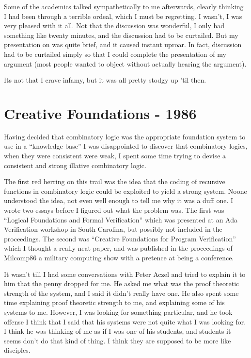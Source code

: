 \documentclass[10pt,titlepage]{book}
\begin{document}
Some of the academics talked sympathetically to me afterwards, clearly thinking I had been through a terrible ordeal, which I must be regretting.
I wasn't, I was very pleased with it all.
Not that the discussion was wonderful, I only had something like twenty minutes, and the discussion had to be curtailed.
But my presentation on was quite brief, and it caused instant uproar.
In fact, discussion had to be curtailed simply so that I could complete the presentation of my argument (most people wanted to object without actually hearing the argument).

Its not that I crave infamy, but it was all pretty stodgy up 'til then.

\section{Creative Foundations - 1986}

Having decided that combinatory logic was the appropriate foundation system to use in a ``knowledge base'' I was disappointed to discover that combinatory logics, when they were consistent were weak, I spent
some time trying to devise a consistent and strong illative combinatory logic.

The first red herring on this trail was the idea that the coding of recursive functions in combinatory logic could be exploited to yield a strong system.
Noone understood the idea, not even well enough to tell me why it was a duff one.
I wrote two essays before I figured out what the problem was.
The first was ``Logical Foundations and Formal Verification'' which was presented at an Ada Verification workshop in South Carolina, but possibly not included in the proceedings.
The second was ``Creative Foundations for Program Verification'' which I thought a really neat paper, and was published in the proceedings of Milcomp86 a military computing show with a pretence at being a conference.

It wasn't till I had some conversations with Peter Aczel and tried to explain it to him that the penny dropped for me.
He asked me what was the proof theoretic strength of the system, and I said it didn't really have one.
He also spent some time explaining proof theoretic strength to me, and explaining some of his systems to me.
However, I was looking for something particular, and he took offense I think that I said that his systems were not quite what I was looking for.
I think he was thinking of me as if I was one of his students, and students it seems don't do that kind of thing.
I think they are supposed to be more like disciples.
\end{document}
